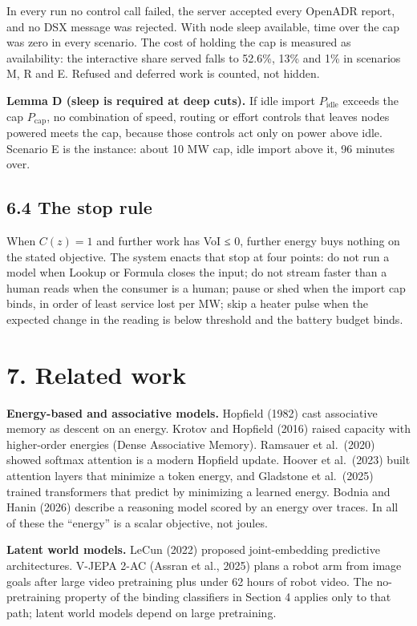 \documentclass[10pt,letterpaper]{article}
\begin{document}
In every run no control call failed, the server accepted every OpenADR
report, and no DSX message was rejected. With node sleep available, time
over the cap was zero in every scenario. The cost of holding the cap is
measured as availability: the interactive share served falls to 52.6\%,
13\% and 1\% in scenarios M, R and E. Refused and deferred work is
counted, not hidden.

\textbf{Lemma D (sleep is required at deep cuts).} If idle import
\(P_{\text{idle}}\) exceeds the cap \(P_{\text{cap}}\), no combination
of speed, routing or effort controls that leaves nodes powered meets the
cap, because those controls act only on power above idle. Scenario E is
the instance: about 10 MW cap, idle import above it, 96 minutes over.

\subsection{6.4 The stop rule}\label{the-stop-rule}

When \(C(z) = 1\) and further work has VoI ≤ 0, further energy buys
nothing on the stated objective. The system enacts that stop at four
points: do not run a model when Lookup or Formula closes the input; do
not stream faster than a human reads when the consumer is a human; pause
or shed when the import cap binds, in order of least service lost per
MW; skip a heater pulse when the expected change in the reading is below
threshold and the battery budget binds.

\section{7. Related work}\label{related-work}

\textbf{Energy-based and associative models.} Hopfield (1982) cast
associative memory as descent on an energy. Krotov and Hopfield (2016)
raised capacity with higher-order energies (Dense Associative Memory).
Ramsauer et al.~(2020) showed softmax attention is a modern Hopfield
update. Hoover et al.~(2023) built attention layers that minimize a
token energy, and Gladstone et al.~(2025) trained transformers that
predict by minimizing a learned energy. Bodnia and Hanin (2026) describe
a reasoning model scored by an energy over traces. In all of these the
``energy'' is a scalar objective, not joules.

\textbf{Latent world models.} LeCun (2022) proposed joint-embedding
predictive architectures. V-JEPA 2-AC (Assran et al., 2025) plans a
robot arm from image goals after large video pretraining plus under 62
hours of robot video. The no-pretraining property of the binding
classifiers in Section 4 applies only to that path; latent world models
depend on large pretraining.
\end{document}
